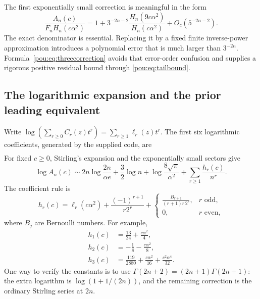 \documentclass[11pt]{article}
\theoremstyle{definition}
\theoremstyle{remark}
\begin{document}
The first exponentially small correction is meaningful in the form
\begin{equation}\label{pou:eq:threecorrection}
 \frac{A_n(c)}{F_nH_n(c\alpha^2)}
 =1+3^{-2n-2}\frac{H_n(9c\alpha^2)}{H_n(c\alpha^2)}
     +O_c(5^{-2n-2}).
\end{equation}
The exact denominator is essential.  Replacing it by a fixed finite
inverse-power approximation introduces a polynomial error that is much
larger than $3^{-2n}$.  Formula~\eqref{pou:eq:threecorrection} avoids that
error-order confusion and supplies a rigorous positive residual bound
through \eqref{pou:eq:tailbound}.

\subsection{The logarithmic expansion and the prior leading equivalent}

Write
$\log(\sum_{r\ge0}C_r(z)t^r)=\sum_{r\ge1}\ell_r(z)t^r$.
The first six logarithmic coefficients, generated by the supplied code,
are
\[
\begin{aligned}

\end{aligned}
\]
For fixed $c\ge0$, Stirling's expansion \cite{dlmfgamma} and the exponentially
small sectors give
\begin{equation}\label{pou:eq:logA}
 \log A_n(c)\sim
 2n\log\frac{2n}{\alpha e}+\frac32\log n
 +\log\frac{8\sqrt\pi}{\alpha^2}
 +\sum_{r\ge1}\frac{h_r(c)}{n^r}.
\end{equation}
The coefficient rule is
\begin{equation}\label{pou:eq:hgeneral}
 h_r(c)=\ell_r(c\alpha^2)+\frac{(-1)^{r+1}}{r2^r}
 +\begin{cases}
 \displaystyle\frac{B_{r+1}}{(r+1)r\,2^r},&r\text{ odd},\\[3pt]
 0,&r\text{ even},
 \end{cases}
\end{equation}
where $B_j$ are Bernoulli numbers.  For example,
\begin{align}
 h_1(c)&=\frac{13}{24}+\frac{c\alpha^2}{4},\nonumber\\
 h_2(c)&=-\frac18-\frac{c\alpha^2}{8},\label{pou:eq:firsth}\\
 h_3(c)&=\frac{119}{2880}+\frac{c\alpha^2}{16}
                       +\frac{c^2\alpha^4}{32}.\nonumber
\end{align}
One way to verify the constants is to use
$\Gamma(2n+2)=(2n+1)\Gamma(2n+1)$: the extra logarithm is
$\log(1+1/(2n))$, and the remaining correction is the ordinary Stirling
series at $2n$.
\end{document}
